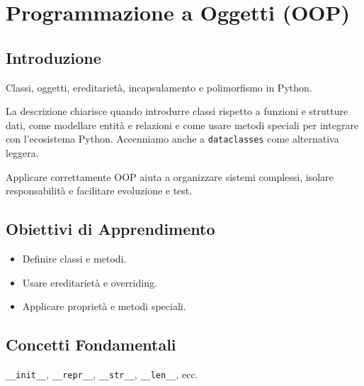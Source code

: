 \chapter{Programmazione a Oggetti (OOP)}

\section{Introduzione}
Classi, oggetti, ereditarietà, incapsulamento e polimorfismo in Python.

La descrizione chiarisce quando introdurre classi rispetto a funzioni e strutture dati, come modellare entità e relazioni e come usare metodi speciali per integrare con l'ecosistema Python. Accenniamo anche a \texttt{dataclasses} come alternativa leggera.

Applicare correttamente OOP aiuta a organizzare sistemi complessi, isolare responsabilità e facilitare evoluzione e test.

\section{Obiettivi di Apprendimento}
\begin{itemize}
  \item Definire classi e metodi.
  \item Usare ereditarietà e overriding.
  \item Applicare proprietà e metodi speciali.
\end{itemize}

\section{Concetti Fondamentali}
\begin{tcolorbox}[title=Metodi speciali]
\texttt{\_\_init\_\_}, \texttt{\_\_repr\_\_}, \texttt{\_\_str\_\_}, \texttt{\_\_len\_\_}, ecc.
\end{tcolorbox}

